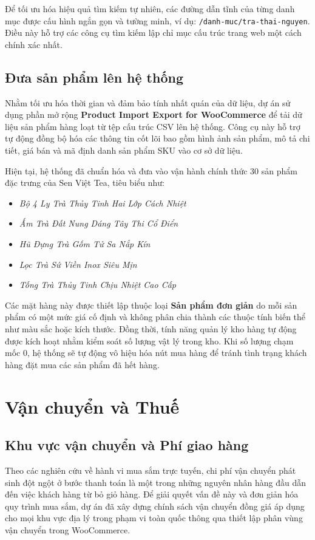 Để tối ưu hóa hiệu quả tìm kiếm tự nhiên, các đường dẫn tĩnh của từng danh mục được cấu hình ngắn gọn và tường minh, ví dụ: \texttt{/danh-muc/tra-thai-nguyen}. Điều này hỗ trợ các công cụ tìm kiếm lập chỉ mục cấu trúc trang web một cách chính xác nhất.

\subsection{Đưa sản phẩm lên hệ thống}
Nhằm tối ưu hóa thời gian và đảm bảo tính nhất quán của dữ liệu, dự án sử dụng phần mở rộng \textbf{Product Import Export for WooCommerce} \cite{plugin_product_import} để tải dữ liệu sản phẩm hàng loạt từ tệp cấu trúc CSV lên hệ thống. Công cụ này hỗ trợ tự động đồng bộ hóa các thông tin cốt lõi bao gồm hình ảnh sản phẩm, mô tả chi tiết, giá bán và mã định danh sản phẩm SKU vào cơ sở dữ liệu.

Hiện tại, hệ thống đã chuẩn hóa và đưa vào vận hành chính thức 30 sản phẩm đặc trưng của Sen Việt Tea, tiêu biểu như:
\begin{itemize}
    \item \textit{Bộ 4 Ly Trà Thủy Tinh Hai Lớp Cách Nhiệt}
    \item \textit{Ấm Trà Đất Nung Dáng Tây Thi Cổ Điển}
    \item \textit{Hũ Đựng Trà Gốm Tử Sa Nắp Kín}
    \item \textit{Lọc Trà Sứ Viền Inox Siêu Mịn}
    \item \textit{Tống Trà Thủy Tinh Chịu Nhiệt Cao Cấp}
\end{itemize}

Các mặt hàng này được thiết lập thuộc loại \textbf{Sản phẩm đơn giản} do mỗi sản phẩm có một mức giá cố định và không phân chia thành các thuộc tính biến thể như màu sắc hoặc kích thước. Đồng thời, tính năng quản lý kho hàng tự động được kích hoạt nhằm kiểm soát số lượng vật lý trong kho. Khi số lượng chạm mốc 0, hệ thống sẽ tự động vô hiệu hóa nút mua hàng để tránh tình trạng khách hàng đặt mua các sản phẩm đã hết hàng.

\section{Vận chuyển và Thuế}

\subsection{Khu vực vận chuyển và Phí giao hàng}
Theo các nghiên cứu về hành vi mua sắm trực tuyến, chi phí vận chuyển phát sinh đột ngột ở bước thanh toán là một trong những nguyên nhân hàng đầu dẫn đến việc khách hàng từ bỏ giỏ hàng. Để giải quyết vấn đề này và đơn giản hóa quy trình mua sắm, dự án đã xây dựng chính sách vận chuyển đồng giá áp dụng cho mọi khu vực địa lý trong phạm vi toàn quốc thông qua thiết lập phân vùng vận chuyển trong WooCommerce.

